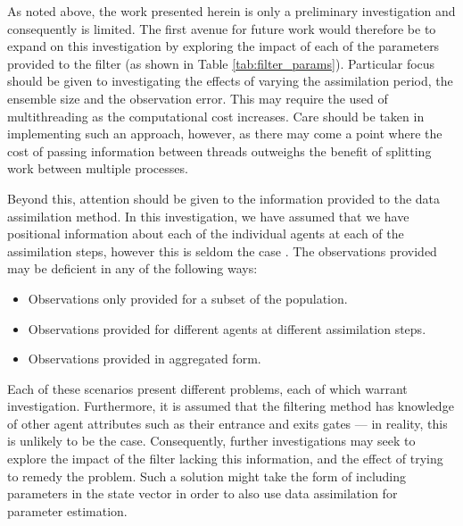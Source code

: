 As noted above, the work presented herein is only a preliminary investigation
and consequently is limited.
The first avenue for future work would therefore be to expand on this
investigation by exploring the impact of each of the parameters provided to the
filter (as shown in Table \ref{tab:filter_params}).
Particular focus should be given to investigating the effects of varying the
assimilation period, the ensemble size and the observation error.
This may require the used of multithreading as the computational cost increases.
Care should be taken in implementing such an approach, however, as there may
come a point where the cost of passing information between threads outweighs the
benefit of splitting work between multiple processes.

Beyond this, attention should be given to the information provided to the data
assimilation method.
In this investigation, we have assumed that we have positional information about
each of the individual agents at each of the assimilation steps, however this is
seldom the case \citep{council2019leeds}.
The observations provided may be deficient in any of the following ways:
\begin{itemize}
    \item Observations only provided for a subset of the population.
    \item Observations provided for different agents at different assimilation
        steps.
    \item Observations provided in aggregated form. 
\end{itemize}
Each of these scenarios present different problems, each of which warrant
investigation.
Furthermore, it is assumed that the filtering method has knowledge of other
agent attributes such as their entrance and exits gates --- in reality, this is
unlikely to be the case.
Consequently, further investigations may seek to explore the impact of the
filter lacking this information, and the effect of trying to remedy the problem.
Such a solution might take the form of including parameters in the state vector
in order to also use data assimilation for parameter estimation.

